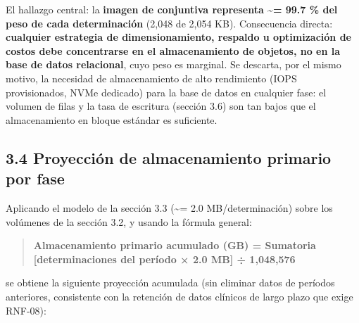 \documentclass[11pt,a4paper]{article}
\begin{document}
El hallazgo central: la \textbf{imagen de conjuntiva representa \textasciitilde= 99.7 \% del peso de cada determinación} (2,048 de 2,054 KB). Consecuencia directa: \textbf{cualquier estrategia de dimensionamiento, respaldo u optimización de costos debe concentrarse en el almacenamiento de objetos, no en la base de datos relacional}, cuyo peso es marginal. Se descarta, por el mismo motivo, la necesidad de almacenamiento de alto rendimiento (IOPS provisionados, NVMe dedicado) para la base de datos en cualquier fase: el volumen de filas y la tasa de escritura (sección 3.6) son tan bajos que el almacenamiento en bloque estándar es suficiente.

\subsection{3.4 Proyección de almacenamiento primario por fase}\label{proyecciuxf3n-de-almacenamiento-primario-por-fase}

Aplicando el modelo de la sección 3.3 (\textasciitilde= 2.0 MB/determinación) sobre los volúmenes de la sección 3.2, y usando la fórmula general:

\begin{quote}
\textbf{Almacenamiento primario acumulado (GB) = Sumatoria {[}determinaciones del período × 2.0 MB{]} ÷ 1,048,576}
\end{quote}

se obtiene la siguiente proyección acumulada (sin eliminar datos de períodos anteriores, consistente con la retención de datos clínicos de largo plazo que exige RNF-08):
\end{document}
